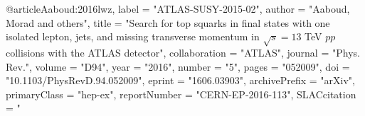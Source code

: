 @article{Aaboud:2016lwz,
      label          = "ATLAS-SUSY-2015-02",
      author         = "Aaboud, Morad and others",
      title          = "{Search for top squarks in final states with one isolated
                        lepton, jets, and missing transverse momentum in
                        $\sqrt{s}=13$ TeV $pp$ collisions with the ATLAS
                        detector}",
      collaboration  = "ATLAS",
      journal        = "Phys. Rev.",
      volume         = "D94",
      year           = "2016",
      number         = "5",
      pages          = "052009",
      doi            = "10.1103/PhysRevD.94.052009",
      eprint         = "1606.03903",
      archivePrefix  = "arXiv",
      primaryClass   = "hep-ex",
      reportNumber   = "CERN-EP-2016-113",
      SLACcitation   = "%
}

